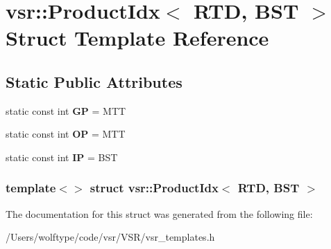 \hypertarget{structvsr_1_1_product_idx_3_01_r_t_d_00_01_b_s_t_01_4}{\section{vsr\-:\-:Product\-Idx$<$ R\-T\-D, B\-S\-T $>$ Struct Template Reference}
\label{structvsr_1_1_product_idx_3_01_r_t_d_00_01_b_s_t_01_4}
}
\subsection*{Static Public Attributes}
\begin{DoxyCompactItemize}
\item 
\hypertarget{structvsr_1_1_product_idx_3_01_r_t_d_00_01_b_s_t_01_4_a4132649d55c98c23bd10722fc2f4a04a}{static const int {\bfseries G\-P} = M\-T\-T}\label{structvsr_1_1_product_idx_3_01_r_t_d_00_01_b_s_t_01_4_a4132649d55c98c23bd10722fc2f4a04a}

\item 
\hypertarget{structvsr_1_1_product_idx_3_01_r_t_d_00_01_b_s_t_01_4_ae13eaac38730cad90a01d06b446a046b}{static const int {\bfseries O\-P} = M\-T\-T}\label{structvsr_1_1_product_idx_3_01_r_t_d_00_01_b_s_t_01_4_ae13eaac38730cad90a01d06b446a046b}

\item 
\hypertarget{structvsr_1_1_product_idx_3_01_r_t_d_00_01_b_s_t_01_4_a645842ffefb7cdeb57bcf0c77eb9c988}{static const int {\bfseries I\-P} = B\-S\-T}\label{structvsr_1_1_product_idx_3_01_r_t_d_00_01_b_s_t_01_4_a645842ffefb7cdeb57bcf0c77eb9c988}

\end{DoxyCompactItemize}
\subsubsection*{template$<$$>$ struct vsr\-::\-Product\-Idx$<$ R\-T\-D, B\-S\-T $>$}



The documentation for this struct was generated from the following file\-:\begin{DoxyCompactItemize}
\item 
/\-Users/wolftype/code/vsr/\-V\-S\-R/vsr\-\_\-templates.\-h\end{DoxyCompactItemize}
